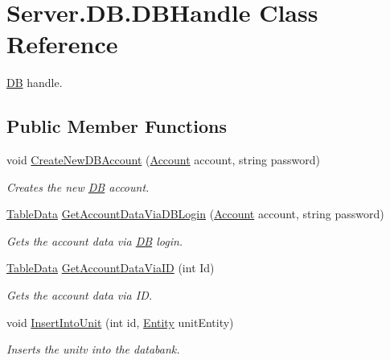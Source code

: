 \hypertarget{classServer_1_1DB_1_1DBHandle}{\section{Server.\-D\-B.\-D\-B\-Handle Class Reference}
\label{classServer_1_1DB_1_1DBHandle}
}


\hyperlink{namespaceServer_1_1DB}{D\-B} handle.  


\subsection*{Public Member Functions}
\begin{DoxyCompactItemize}
\item 
void \hyperlink{classServer_1_1DB_1_1DBHandle_a81ca48e0929da58ec2ac4b55081d16c8}{Create\-New\-D\-B\-Account} (\hyperlink{classCore_1_1Models_1_1Account}{Account} account, string password)
\begin{DoxyCompactList}\small\item\em Creates the new \hyperlink{namespaceServer_1_1DB}{D\-B} account. \end{DoxyCompactList}\item 
\hyperlink{classServer_1_1DB_1_1Models_1_1TableData}{Table\-Data} \hyperlink{classServer_1_1DB_1_1DBHandle_a3a15cdbe25a8893c41f90b334ae34f66}{Get\-Account\-Data\-Via\-D\-B\-Login} (\hyperlink{classCore_1_1Models_1_1Account}{Account} account, string password)
\begin{DoxyCompactList}\small\item\em Gets the account data via \hyperlink{namespaceServer_1_1DB}{D\-B} login. \end{DoxyCompactList}\item 
\hyperlink{classServer_1_1DB_1_1Models_1_1TableData}{Table\-Data} \hyperlink{classServer_1_1DB_1_1DBHandle_a8f5f08824cea64c884f93494bd55c623}{Get\-Account\-Data\-Via\-I\-D} (int Id)
\begin{DoxyCompactList}\small\item\em Gets the account data via I\-D. \end{DoxyCompactList}\item 
void \hyperlink{classServer_1_1DB_1_1DBHandle_ab381614c199bdf2782df0c69e99edfb4}{Insert\-Into\-Unit} (int id, \hyperlink{classCore_1_1Models_1_1Entity}{Entity} unit\-Entity)
\begin{DoxyCompactList}\small\item\em Inserts the unitv into the databank. \end{DoxyCompactList}\item 

\end{DoxyCompactItemize}

